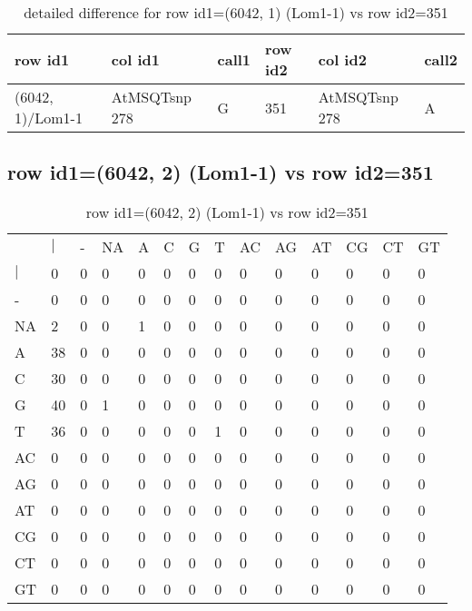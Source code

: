 \begin{center}
\begin{longtable}{|l|l|l|l|l|l|}
\caption{detailed difference for row id1=(6042, 1) (Lom1-1) vs row id2=351} \label{table_dm27}\\
\hline
row id1&col id1&call1&row id2&col id2&call2\\
\hline
(6042, 1)/Lom1-1&AtMSQTsnp 278&G&351&AtMSQTsnp 278&A\\
\hline
\end{longtable}
\end{center}

\subsection{row id1=(6042, 2) (Lom1-1) vs row id2=351}
\begin{center}
\begin{longtable}{|l|l|l|l|l|l|l|l|l|l|l|l|l|l|}
\caption{row id1=(6042, 2) (Lom1-1) vs row id2=351} \label{table_dm28}\\
\hline
\\
\hline
&$|$&-&NA&A&C&G&T&AC&AG&AT&CG&CT&GT\\
$|$&0&0&0&0&0&0&0&0&0&0&0&0&0\\
-&0&0&0&0&0&0&0&0&0&0&0&0&0\\
NA&2&0&0&1&0&0&0&0&0&0&0&0&0\\
A&38&0&0&0&0&0&0&0&0&0&0&0&0\\
C&30&0&0&0&0&0&0&0&0&0&0&0&0\\
G&40&0&1&0&0&0&0&0&0&0&0&0&0\\
T&36&0&0&0&0&0&1&0&0&0&0&0&0\\
AC&0&0&0&0&0&0&0&0&0&0&0&0&0\\
AG&0&0&0&0&0&0&0&0&0&0&0&0&0\\
AT&0&0&0&0&0&0&0&0&0&0&0&0&0\\
CG&0&0&0&0&0&0&0&0&0&0&0&0&0\\
CT&0&0&0&0&0&0&0&0&0&0&0&0&0\\
GT&0&0&0&0&0&0&0&0&0&0&0&0&0\\
\hline
\end{longtable}
\end{center}

